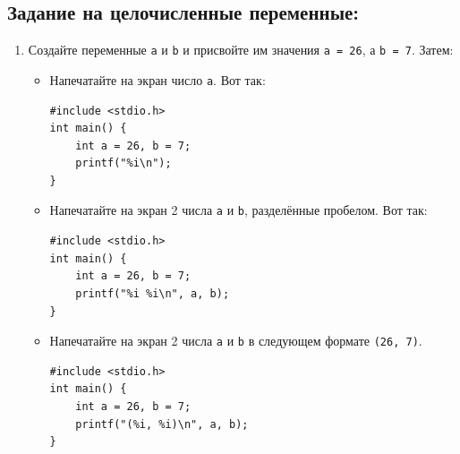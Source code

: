 \documentclass{article}
\begin{document}
\subsection*{Задание на целочисленные переменные:}
\begin{enumerate}
\item Создайте переменные \texttt{a} и \texttt{b} и присвойте им значения \texttt{a = 26}, а \texttt{b = 7}. Затем:
\begin{itemize}
\item Напечатайте на экран число \texttt{a}. Вот так:
\begin{lstlisting}[backgroundcolor = \color{solcolor}]
#include <stdio.h>
int main() {
	int a = 26, b = 7;
	printf("%i\n");
}
\end{lstlisting}
\item Напечатайте на экран 2 числа \texttt{a} и \texttt{b}, разделённые пробелом. Вот так:
\begin{lstlisting}[backgroundcolor = \color{solcolor}]
#include <stdio.h>
int main() {
	int a = 26, b = 7;
	printf("%i %i\n", a, b);
}
\end{lstlisting}

\item Напечатайте на экран 2 числа \texttt{a} и \texttt{b} в следующем формате \texttt{(26, 7)}.
\begin{lstlisting}[backgroundcolor = \color{solcolor}]
#include <stdio.h>
int main() {
	int a = 26, b = 7;
	printf("(%i, %i)\n", a, b);
}
\end{lstlisting}


\end{itemize}
\end{enumerate}
\end{document}
